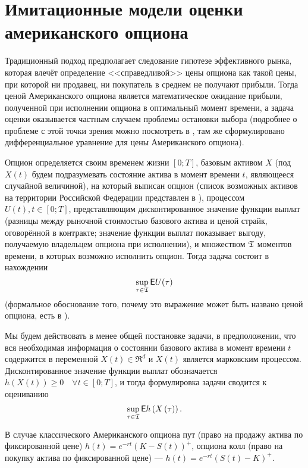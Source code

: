 \chapter{Имитационные модели оценки американского опциона}

Традиционный подход предполагает следование гипотезе эффективного рынка, которая влечёт определение <<справедливой>> цены опциона как такой цены, при которой ни продавец, ни покупатель в среднем не получают прибыли. Тогда ценой Американского опциона является математическое ожидание прибыли, полученной при исполнении опциона в оптимальный момент времени, а задача оценки оказывается частным случаем проблемы остановки выбора (подробнее о проблеме с этой точки зрения можно посмотреть в \cite{Peskir2006}, там же сформулировано дифференциальное уравнение для цены Американского опциона).

Опцион определяется своим временем жизни $[0;T]$, базовым активом $X$ (под $X(t)$ будем подразумевать состояние актива в момент времени $t$, являющееся случайной величиной), на который выписан опцион (список возможных активов на территории Российской Федерации представлен в \cite{fsfr}), процессом $U(t), t\in [0;T]$, представляющим дисконтированное значение функции выплат (разницы между рыночной стоимостью базового актива и ценой страйк, оговорённой в контракте; значение функции выплат показывает выгоду, получаемую владельцем опциона при исполнении), и множеством $\mathfrak{T}$ моментов времени, в которых возможно исполнить опцион. Тогда задача состоит в нахождении 
\begin{equation}\label{eq:supremum_of_expectation}
	\sup_{\tau\in\mathfrak{T}} \mathsf{E} U(\tau)
\end{equation}
(формальное обоснование того, почему это выражение может быть названо ценой опциона, есть в \cite{Duffie2001}).

Мы будем действовать в менее общей постановке задачи, в предположении, что вся необходимая информация о состоянии базового актива в момент времени $t$ содержится в переменной $X(t)\in \mathfrak{R}^d$ и $X(t)$ является марковским процессом. Дисконтированное значение функции выплат обозначается $h\left(X\left(t\right)\right) \geq 0 \quad\forall t\in \left[0;T\right]$, и тогда формулировка задачи сводится к оцениванию $$\sup_{\tau\in\mathfrak{T}}\mathsf{E} h\left(X\left(\tau\right)\right).$$

В случае классического Американского опциона пут (право на продажу актива по фиксированной цене) $h(t) = e^{-rt}\left(K-S\left(t\right)\right)^+$, опциона колл (право на покупку актива по фиксированной цене) --- $h(t) = e^{-rt}\left(S\left(t\right) - K\right)^+$.

